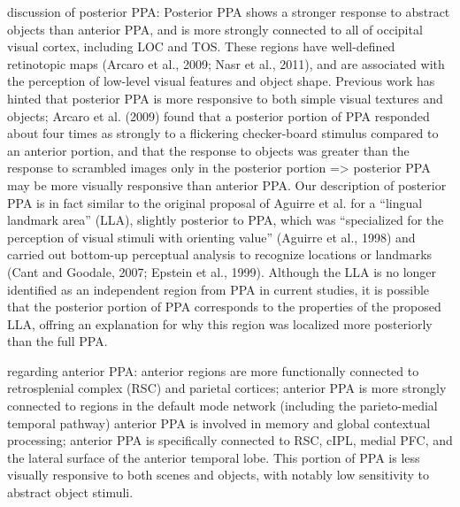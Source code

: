 \documentclass[english]{article}
\begin{document}
\citep{baldassano2013differential} discussion of posterior PPA: Posterior PPA
shows a stronger response to abstract objects than anterior PPA, and is more
strongly connected to all of occipital visual cortex, including LOC and TOS.
%
These regions have well-defined retinotopic maps (Arcaro et al., 2009; Nasr et
al., 2011), and are associated with the perception of low-level visual features
and object shape.
%
Previous work has hinted that posterior PPA is more responsive to both simple
visual textures and objects; Arcaro et al. (2009) found that a posterior portion
of PPA responded about four times as strongly to a flickering checker-board
stimulus compared to an anterior portion, and that the response to objects was
greater than the response to scrambled images only in the posterior portion =>
posterior PPA may be more visually responsive than anterior PPA.
%
Our description of posterior PPA is in fact similar to the original proposal of
Aguirre et al. for a “lingual landmark area” (LLA), slightly posterior to PPA,
which was “specialized for the perception of visual stimuli with orienting
value” (Aguirre et al., 1998) and carried out bottom-up perceptual analysis to
recognize locations or landmarks (Cant and Goodale, 2007; Epstein et al., 1999).
%
Although the LLA is no longer identified as an independent region from PPA in
current studies, it is possible that the posterior portion of PPA corresponds to
the properties of the proposed LLA, offring an explanation for why this region
was localized more posteriorly than the full PPA.

\citep{baldassano2013differential} regarding anterior PPA: anterior regions are
more functionally connected to retrosplenial complex (RSC) and parietal
cortices; anterior PPA is more strongly connected to regions in the default mode
network (including the parieto-medial temporal pathway)
%
anterior PPA is involved in memory and global contextual processing; anterior
PPA is specifically connected to RSC, cIPL, medial PFC, and the lateral surface
of the anterior temporal lobe.
%
This portion of PPA is less visually responsive
to both scenes and objects, with notably low sensitivity to abstract object
stimuli.
\end{document}
